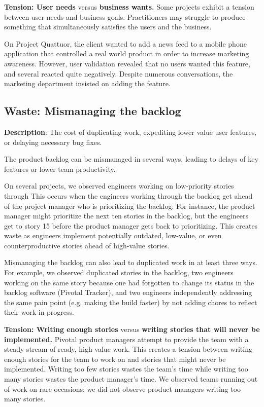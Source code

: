\textbf{Tension: User needs} versus \textbf{business wants.}
Some projects exhibit a tension between user needs and business goals. Practitioners may struggle to produce something that simultaneously satisfies the users and the business.

On Project Quattuor, the client wanted to add a news feed to a mobile phone application that controlled a real world product in order to increase marketing awareness. However, user validation revealed that no users wanted this feature, and several reacted quite negatively. Despite numerous conversations, the marketing department insisted on adding the feature. 

\subsection{Waste: Mismanaging the backlog}
\textbf{Description}: The cost of duplicating work, expediting lower value user features, or delaying necessary bug fixes.

The product backlog can be mismanaged in several ways, leading to delays of key features or lower team productivity. 

On several projects, we observed engineers working on low-priority stories through  This occurs when the engineers working through the backlog get ahead of the project manager who is prioritizing the backlog. For instance, the product manager might prioritize the next ten stories in the backlog, but the engineers get to story 15 before the product manager gets back to prioritizing. This creates waste as engineers implement potentially outdated, low-value, or even counterproductive stories ahead of high-value stories.   

Mismanaging the backlog can also lead to duplicated work in at least three ways. For example, we observed duplicated stories in the backlog, two engineers working on the same story because one had forgotten to change its status in the backlog software (Pivotal Tracker), and two engineers independently addressing the same pain point (e.g. making the build faster) by not adding chores to reflect their work in progress.

\textbf{Tension: Writing enough stories} versus \textbf{writing stories that will never be implemented.}
Pivotal product managers attempt to provide the team with a steady stream of ready, high-value work. This creates a tension between writing enough stories for the team to work on and  stories that might never be implemented. Writing too few stories wastes the team's time while writing too many stories wastes the product manager's time. We observed teams running out of work on rare occasions; we did not observe product managers writing too many stories.  

